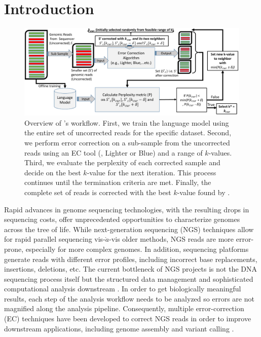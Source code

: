 \section{Introduction}
\begin{figure}
\centering
\includegraphics[width=\linewidth]{figs/AthenaOverview_Compressed2_cropped.pdf}
\caption{Overview of \name's workflow. First, we train the language model using the entire set of uncorrected reads for the specific dataset. Second, we perform error correction on a sub-sample from the uncorrected reads using an EC tool (\eg, Lighter or Blue) and a range of $k$-values. Third, we evaluate the perplexity of each corrected sample and decide on the best $k$-value for the next iteration. This process continues until the termination criteria are met. Finally, the complete set of reads is corrected with the best $k$-value found by \name.}	
\label{fig:AthenaOverview}
\end{figure}
\vspace{-10pt}
Rapid advances in genome sequencing technologies, with the resulting drops in sequencing costs, offer unprecedented opportunities to characterize genomes across the tree of life. %
While next-generation sequencing (NGS) techniques allow for rapid parallel sequencing vis-$\grave{a}$-vis older methods, NGS reads are more error-prone, especially for more complex genomes. %
In addition, sequencing platforms generate reads with different error profiles, including incorrect base replacements, insertions, deletions, etc. The current bottleneck of NGS projects is not the DNA sequencing process itself but the structured data management and sophisticated computational analysis downstream \cite{schadt2010computational}. In order to get biologically meaningful results, each step of the analysis workflow needs to be analyzed so errors are not magnified along the analysis pipeline.
Consequently, multiple error-correction (EC) techniques have been developed to correct NGS reads in order to improve downstream applications, including genome assembly and variant calling \cite{szalay2015novo}. 

